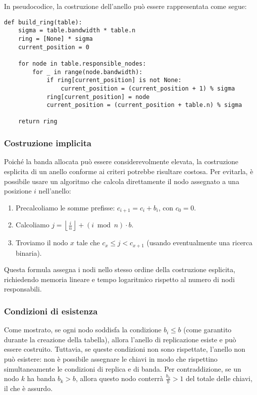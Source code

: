 \begin{samepage}
\noindent In pseudocodice, la costruzione dell'anello può essere rappresentata come segue:
\begin{verbatim}
def build_ring(table):
    sigma = table.bandwidth * table.n
    ring = [None] * sigma
    current_position = 0

    for node in table.responsible_nodes:
        for _ in range(node.bandwidth):
            if ring[current_position] is not None:
                current_position = (current_position + 1) % sigma
            ring[current_position] = node
            current_position = (current_position + table.n) % sigma

    return ring
\end{verbatim}
\end{samepage}

\subsubsection{Costruzione implicita}
\label{subsubsec:costruzione-implicita}

Poiché la banda allocata può essere considerevolmente elevata, la costruzione esplicita di un anello conforme ai criteri potrebbe risultare costosa.
Per evitarla, è possibile usare un algoritmo che calcola direttamente il nodo assegnato a una posizione $i$ nell'anello:

\begin{enumerate}
    \item Precalcoliamo le somme prefisse: $c_{i+1} = c_i + b_i$, con $c_0 = 0$.
    \item Calcoliamo $j = \left\lfloor \frac{i}{n} \right\rfloor + (i \bmod n) \cdot b$.
    \item Troviamo il nodo $x$ tale che $c_x \leq j < c_{x+1}$ (usando eventualmente una ricerca binaria).
\end{enumerate}

Questa formula assegna i nodi nello stesso ordine della costruzione esplicita, richiedendo memoria lineare e tempo logaritmico rispetto al numero di nodi responsabili.

\subsubsection{Condizioni di esistenza}
\label{subsubsec:esistenza}

Come mostrato, se ogni nodo soddisfa la condizione $b_i \leq b$ (come garantito durante la creazione della tabella), allora l'anello di replicazione esiste e può essere costruito.
Tuttavia, se queste condizioni non sono rispettate, l'anello non può esistere: non è possibile assegnare le chiavi in modo che rispettino simultaneamente le condizioni di replica e di banda.
Per contraddizione, se un nodo $k$ ha banda $b_k > b$, allora questo nodo conterrà $\frac{b_k}{b} > 1$ del totale delle chiavi, il che è assurdo.

